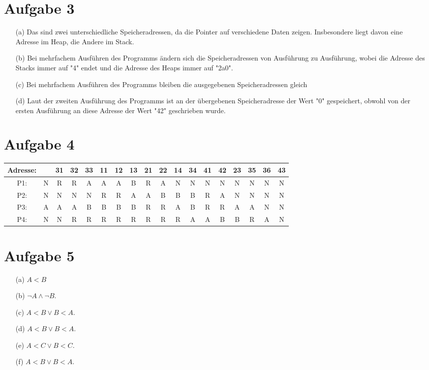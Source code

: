\documentclass[12pt,a4paper,oneside,ngerman]{article}
\begin{document}
\section*{Aufgabe 3}
\begin{enumerate}
	\item[(a)] Das sind zwei unterschiedliche Speicheradressen, da die Pointer auf verschiedene Daten zeigen. Insbesondere liegt davon eine Adresse im Heap, die Andere im Stack.
	
	\item[(b)] Bei mehrfachem Ausführen des Programms ändern sich die Speicheradressen von Ausführung zu Ausführung, wobei die Adresse des Stacks immer auf "4" endet und die Adresse des Heaps immer auf "2a0".
	
	\item [(c)] Bei mehrfachem Ausführen des Programms bleiben die ausgegebenen Speicheradressen gleich
	
	\item[(d)] Laut der zweiten Ausführung des Programms ist an der übergebenen Speicheradresse der Wert "0" gespeichert, obwohl von der ersten Ausführung an diese Adresse der Wert "42" geschrieben wurde.
\end{enumerate}

\section*{Aufgabe 4}
\begin{center}
	\begin{tabular}{ |c|c|c|c|c|c|c|c|c|c|c|c|c|c|c|c|c|c| }
		\hline
		Adresse: & & 31 & 32 & 33 & 11 & 12 & 13 & 21 & 22 & 14 & 34 & 41 & 42 & 23 & 35 & 36 & 43 \\
		\hline
		P1: & N & R & R & A & A & A & B & R & A & N & N & N & N & N & N & N & N \\  
		P2: & N & N & N & N & R & R & A & A & B & B & B & R & A & N & N & N & N \\
		P3: & A & A & A & B & B & B & B & R & R & A & B & R & R & A & A & N & N \\
		P4: & N & N & R & R & R & R & R & R & R & R & A & A & B & B & R & A & N \\
		\hline
	\end{tabular}
\end{center}

\section*{Aufgabe 5}
\begin{enumerate}
	\item[(a)] $A<B$
	\item[(b)] $\neg A\wedge\neg B$.
	\item[(c)] $A<B \vee B<A$.
	\item[(d)] $A<B \vee B<A$.
	\item[(e)] $A<C \vee B<C$.
	\item[(f)] $A<B \vee B<A$.
\end{enumerate}
\end{document}
